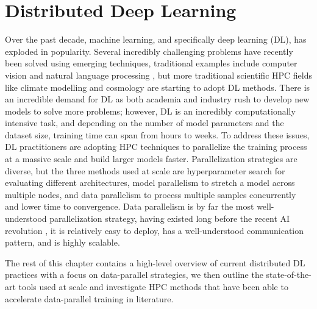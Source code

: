 
\chapter[Distributed Deep Learning]{Distributed Deep Learning}\label{ch:DistributedDL}
Over the past decade, machine learning, and specifically deep learning (DL), has exploded in popularity.
Several incredibly challenging problems have recently been solved using emerging techniques, traditional examples include computer vision \cite{Krizhevsky2012AlexNet} and natural language processing \cite{Vaswani2017AttentionTransformer}, but more traditional scientific HPC fields like climate modelling \cite{Ham2019DLENSOForcasts} and cosmology \cite{Mathuriya2019Cosmoflow} are starting to adopt DL methods.
There is an incredible demand for DL as both academia and industry rush to develop new models to solve more problems; however, DL is an incredibly computationally intensive task, and depending on the number of model parameters and the dataset size, training time can span from hours to weeks.
To address these issues, DL practitioners are adopting HPC techniques to parallelize the training process at a massive scale and build larger models faster.
Parallelization strategies are diverse, but the three methods used at scale are hyperparameter search for evaluating different architectures, model parallelism to stretch a model across multiple nodes, and data parallelism to process multiple samples concurrently and lower time to convergence.
Data parallelism is by far the most well-understood parallelization strategy, having existed long before the recent AI revolution \cite{Zhang1990BPonCM2}, it is relatively easy to deploy, has a well-understood communication pattern, and is highly scalable.

The rest of this chapter contains a high-level overview of current distributed DL practices with a focus on data-parallel strategies, we then outline the state-of-the-art tools used at scale and investigate HPC methods that have been able to accelerate data-parallel training in literature.

